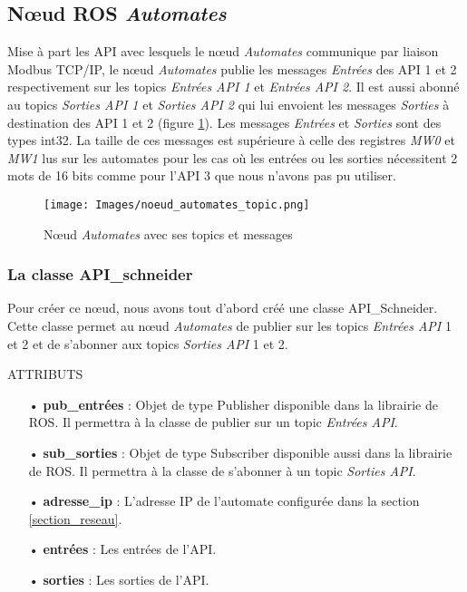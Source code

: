 \documentclass[a4paper,french, titlepage]{book}
\begin{document}
\subsection{Nœud ROS \textit{Automates}}

Mise à part les API avec lesquels le nœud \emph{Automates} communique par liaison Modbus TCP/IP, le nœud \emph{Automates} publie les messages \emph{Entrées} des API 1 et 2 respectivement sur les topics \emph{Entrées API 1} et \emph{Entrées API 2}. Il est aussi abonné au topics \emph{Sorties API 1} et \emph{Sorties API 2} qui lui envoient les messages \emph{Sorties} à destination des API 1 et 2 (figure \ref{schema_noeud_automates_topic}). Les messages \emph{Entrées} et \emph{Sorties} sont des types int32. La taille de ces messages est supérieure à celle des registres \emph{MW0} et \emph{MW1} lus sur les automates pour les cas où les entrées ou les sorties nécessitent 2 mots de 16 bits comme pour l'API 3 que nous n'avons pas pu utiliser.

\begin{figure}[H] 
\begin{center}
\texttt{[image: Images/noeud\_automates\_topic.png]} 
\end{center}
\caption{Nœud \emph{Automates} avec ses topics et messages}
\label{schema_noeud_automates_topic}
\end{figure}

\subsubsection{La classe API\_schneider}

Pour créer ce nœud, nous avons tout d'abord créé une classe API\_Schneider. Cette classe permet au nœud \emph{Automates} de publier sur les topics \emph{Entrées API} 1 et 2 et de s'abonner aux topics\emph{ Sorties API} 1 et 2.

\begin{center}
ATTRIBUTS
\end{center}

\begin{itemize}
\item[•] \textbf{pub\_entrées} : Objet de type Publisher disponible dans la librairie de ROS. Il permettra à la classe de publier sur un topic \emph{Entrées API}.
\item[•] \textbf{sub\_sorties} : Objet de type Subscriber disponible aussi dans la librairie de ROS. Il permettra à la classe de s'abonner à un topic \emph{Sorties API}.
\item[•] \textbf{adresse\_ip} : L'adresse IP de l'automate configurée dans la section \ref{section_reseau}.
\item[•] \textbf{entrées} : Les entrées de l'API.
\item[•] \textbf{sorties} : Les sorties de l'API.
\end{itemize}
\end{document}
